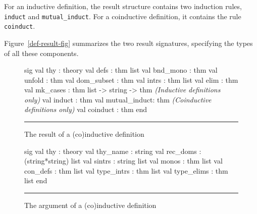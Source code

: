 For an inductive definition, the result structure contains two induction rules,
{\tt induct} and \verb|mutual_induct|.  For a coinductive definition, it
contains the rule \verb|coinduct|.

Figure~\ref{def-result-fig} summarizes the two result signatures,
specifying the types of all these components.

\begin{figure}
\begin{ttbox}
sig
val thy          : theory
val defs         : thm list
val bnd_mono     : thm
val unfold       : thm
val dom_subset   : thm
val intrs        : thm list
val elim         : thm
val mk_cases     : thm list -> string -> thm
{\it(Inductive definitions only)} 
val induct       : thm
val mutual_induct: thm
{\it(Coinductive definitions only)}
val coinduct    : thm
end
\end{ttbox}
\hrule
\caption{The result of a (co)inductive definition} \label{def-result-fig}

\medskip
\begin{ttbox}
sig  
val thy          : theory
val thy_name     : string
val rec_doms     : (string*string) list
val sintrs       : string list
val monos        : thm list
val con_defs     : thm list
val type_intrs   : thm list
val type_elims   : thm list
end
\end{ttbox}
\hrule
\caption{The argument of a (co)inductive definition} \label{def-arg-fig}
\end{figure}

